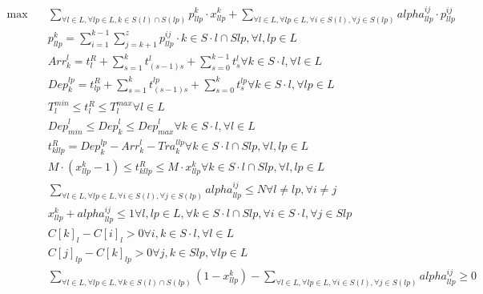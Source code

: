 \begin{align}
  \max\quad & \sum_{\forall l \in L, \forall lp \in L, k \in S \left(l\right) \cap S \left(lp\right)} p_{l lp}^{k} \cdot x_{l lp}^{k} + \sum_{\forall l \in L, \forall lp \in L, \forall i \in S \left(l\right), \forall j \in S \left(lp\right)} \mathit{alpha}_{l lp}^{i j} \cdot p_{l lp}^{i j} \tag{eq\_0001} \\
  & p_{l lp}^{k} = \sum_{i = 1}^{k - 1} \sum_{j = k + 1}^{z} p_{l lp}^{i j} \cdot k \in S \cdot l \cap S lp , \forall l , lp \in L \tag{eq\_0002} \\
  & \mathit{Arr}_{k}^{l} = t_{l}^{R} + \sum_{s = 1}^{k} t_{\left(s - 1\right) s}^{l} + \sum_{s = 0}^{k - 1} t_{s}^{l} \forall k \in S \cdot l , \forall l \in L \tag{eq\_0003} \\
  & \mathit{Dep}_{k}^{lp} = t_{lp}^{R} + \sum_{s = 1}^{k} t_{\left(s - 1\right) s}^{lp} + \sum_{s = 0}^{k} t_{s}^{lp} \forall k \in S \cdot l , \forall lp \in L \tag{eq\_0004} \\
  & T_{l}^{min} \leq t_{l}^{R} \leq T_{l}^{max} \forall l \in L \tag{eq\_0005} \\
  & \mathit{Dep}_{min}^{l} \leq \mathit{Dep}_{k}^{l} \leq \mathit{Dep}_{max}^{l} \forall k \in S \cdot l , \forall l \in L \tag{eq\_0006} \\
  & t_{k l lp}^{R} = \mathit{Dep}_{k}^{lp} - \mathit{Arr}_{k}^{l} - \mathit{Tra}_{k}^{l lp} \forall k \in S \cdot l \cap S lp , \forall l , lp \in L \tag{eq\_0007} \\
  & M \cdot \left(x_{l lp}^{k} - 1\right) \leq t_{k l lp}^{R} \leq M \cdot x_{l lp}^{k} \forall k \in S \cdot l \cap S lp , \forall l , lp \in L \tag{eq\_0009} \\
  & \sum_{\forall l \in L, \forall lp \in L, \forall i \in S \left(l\right), \forall j \in S \left(lp\right)} \mathit{alpha}_{l lp}^{i j} \leq N \forall l \neq lp , \forall i \neq j \tag{eq\_0010} \\
  & x_{l lp}^{k} + \mathit{alpha}_{l lp}^{i j} \leq 1 \forall l , lp \in L , \forall k \in S \cdot l \cap S lp , \forall i \in S \cdot l , \forall j \in S lp \tag{eq\_0011} \\
  & C \left[k\right]_{l} - C \left[i\right]_{l} > 0 \forall i , k \in S \cdot l , \forall l \in L \tag{eq\_0012} \\
  & C \left[j\right]_{lp} - C \left[k\right]_{lp} > 0 \forall j , k \in S lp , \forall lp \in L \tag{eq\_0013} \\
  & \sum_{\forall l \in L, \forall lp \in L, \forall k \in S \left(l\right) \cap S \left(lp\right)} \left(1 - x_{l lp}^{k}\right) - \sum_{\forall l \in L, \forall lp \in L, \forall i \in S \left(l\right), \forall j \in S \left(lp\right)} \mathit{alpha}_{l lp}^{i j} \geq 0 \tag{eq\_0014} \\

\end{align}
